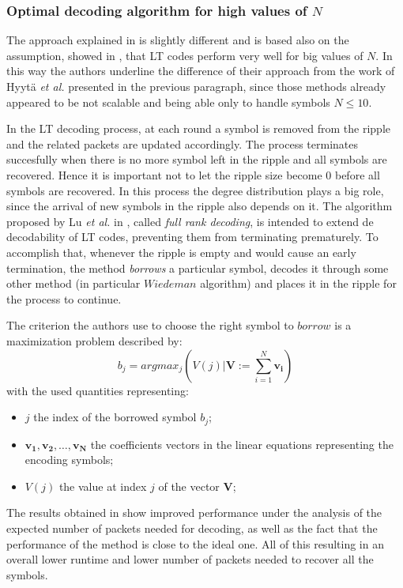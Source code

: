 \subsubsection{Optimal decoding algorithm for high values of $N$}
The approach explained in \cite{Lu} is slightly different and is based also on the assumption, showed in \cite{Shokrollahi2006}, that LT codes perform very well for big values of $N$. In this way the authors underline the difference of their approach from the work of Hyyt\"a \textit{et al.} presented in the previous paragraph, since those methods already appeared to be not scalable and being able only to handle symbols $N \leq 10$.

In the LT decoding process, at each round a symbol is removed from the ripple and the related packets are updated accordingly. The process terminates succesfully when there is no more symbol left in the ripple and all symbols are recovered. Hence it is important not to let the ripple size become $0$ before all symbols are recovered. In this process the degree distribution plays a big role, since the arrival of new symbols in the ripple also depends on it. The algorithm proposed by Lu \textit{et al.} in \cite{Lu}, called \textit{full rank decoding}, is intended to extend de decodability of LT codes, preventing them from terminating prematurely. To accomplish that, whenever the ripple is empty and would cause an early termination, the method \textit{borrows} a particular symbol, decodes it through some other method (in particular $Wiedeman$ algorithm) and places it in the ripple for the process to continue.

The criterion the authors use to choose the right symbol to $borrow$ is a maximization problem described by:
\begin{equation}
  b_j = argmax_j (V(j)|\mathbf{V} := \sum_{i=1}^{N}\mathbf{v_i})
\end{equation}
with the used quantities representing:
\begin{itemize}
  \item $j$ the index of the borrowed symbol $b_j$;
  \item $\mathbf{v_1},\mathbf{v_2},\dots,\mathbf{v_N}$ the coefficients vectors in the linear equations representing the encoding symbols;
  \item $V(j)$ the value at index $j$ of the vector $\mathbf{V}$;
\end{itemize}

The results obtained in \cite{Lu} show improved performance under the analysis of the expected number of packets needed for decoding, as well as the fact that the performance of the method is close to the ideal one. All of this resulting in an overall lower runtime and lower number of packets needed to recover all the symbols.
